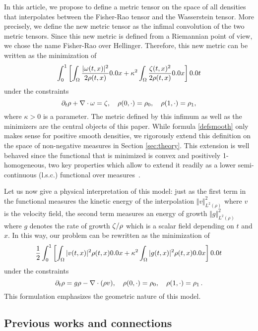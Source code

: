 In this article, we propose to define a metric tensor on the space of all densities that interpolates between the Fisher-Rao tensor and the Wasserstein tensor. More precisely, we define the new metric tensor as the infimal convolution of the two metric tensors.
Since this new metric is defined from a Riemannian point of view, we chose the name Fisher-Rao over Hellinger.
Therefore, this new metric can be written as the minimization of
\begin{equation}
 \int_0^1 \left[ \int_{\Om} \frac{|\M(t,x)|^2}{2\rho(t,x)} \d x 
 + \kappa^2 \int_{\Om} \frac{\Z(t,x)^2}{2\rho(t,x)} \d x\right] \d t
\label{defsmooth}
\end{equation}
under the constraints  
\begin{equation}
 	\D_t \rho + \nabla \cdot \M = \Z,  \quad \rho(0,\cdot)=\rho_0, \quad \rho(1,\cdot)=\rho_1, 
 \label{continuity with source intro}
\end{equation}
where $\kappa>0$ is a parameter. 
The metric defined by this infimum as well as the minimizers are the central objects of this paper. While formula \eqref{defsmooth} only makes sense for positive smooth densities, we rigorously extend this definition on the space of non-negative measures in Section \ref{sec:theory}. This extension is well behaved since the functional that is minimized is convex and positively 1-homogeneous, two key properties which allow to extend it readily as a lower semi-continuous (l.s.c.) functional over measures~\cite{bouchitte1990new}.

Let us now give a physical interpretation of this model: just as the first term in the functional measures the kinetic energy of the interpolation $\Vert v \Vert^2_{L^2(\rho)} $ where $v$ is the velocity field, the second term measures an energy of growth $\Vert g \Vert^2_{L^2(\rho)} $ where $g$ denotes the rate of growth $\zeta/\rho$ which is a scalar field depending on $t$ and $x$. In this way, our problem can be rewritten as the minimization of
\[
\frac12 \int_0^1 \left[ \int_{\Omega} |v(t,x)|^2 \rho(t,x) \d x  + \kappa^2 \int_{\Omega} |g(t,x)|^2 \rho(t,x) \d x \right] \d t
\]
under the constraints
\[
\partial_t \rho = g\rho - \nabla \cdot (\rho v) , \quad \rho(0,\cdot) = \rho_0 , \quad  \rho(1,\cdot) = \rho_1\, .
\]
This formulation emphasizes the geometric nature of this model. 
\subsection{Previous works and connections}
\label{previous works}


